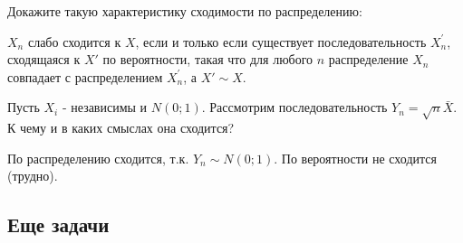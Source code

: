 {%



Докажите такую характеристику сходимости по распределению:

$X_{n}$ слабо сходится к $X$, если и только если существует последовательность $X_{n}^{'}$, сходящаяся к $X'$ по вероятности, такая что для любого $n$ распределение $X_{n}$ совпадает с распределением $X_{n}^{'}$, а $ X'\sim X $.



Пусть $ X_{i} $ - независимы и $ N(0;1) $. Рассмотрим последовательность $ Y_{n}=\sqrt{n}\bar{X} $. К чему и в каких смыслах она сходится?

По распределению сходится, т.к. $ Y_{n}\sim N(0;1) $. По вероятности не сходится (трудно).




}\subsection{Еще задачи}


